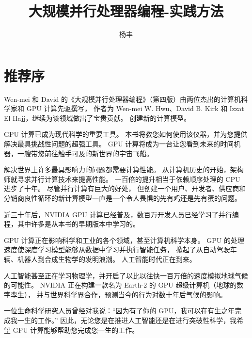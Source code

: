 \documentclass{ctexart}
\numberwithin{equation}{section}
\begin{document}
\title{大规模并行处理器编程-实践方法}

\author{杨丰}
\date{}
\maketitle

\tableofcontents

\newpage
\section*{推荐序}
Wen-mei 和 David 的《大规模并行处理器编程》（第四版）由两位杰出的计算机科学家和 GPU 计算先驱撰写，
作者为 Wen-mei W. Hwu、David B. Kirk 和 Izzat El Hajj，继续为该领域做出了宝贵贡献。 创建新的计算模型。

GPU 计算已成为现代科学的重要工具。 本书将教您如何使用该仪器，并为您提供解决最具挑战性问题的超强工具。 
GPU 计算将成为一台让您看到未来的时间机器，一艘带您前往触手可及的新世界的宇宙飞船。

解决世界上许多最具影响力的问题都需要计算性能。 从计算机历史的开始，架构师就寻求并行计算技术来提高性能。 
一百倍的提升相当于依赖顺序处理的 CPU 进步了十年。 尽管并行计算有巨大的好处，
但创建一个用户、开发者、供应商和分销商良性循环的新计算模型一直是一个令人畏惧的先有鸡还是先有蛋的问题。

近三十年后，NVIDIA GPU 计算已经普及，数百万开发人员已经学习了并行编程，其中许多是从本书的早期版本中学习的。

GPU 计算正在影响科学和工业的各个领域，甚至计算机科学本身。 GPU 的处理速度使深度学习模型能够从数据中学习并执行智能任务，
掀起了从自动驾驶车辆、机器人到合成生物学的发明浪潮。 人工智能时代正在到来。

人工智能甚至正在学习物理学，并开启了以比以往快一百万倍的速度模拟地球气候的可能性。 
NVIDIA 正在构建一款名为 Earth-2 的 GPU 超级计算机（地球的数字孪生），
并与世界科学界合作，预测当今的行为对数十年后气候的影响。

一位生命科学研究人员曾经对我说：“因为有了你的 GPU，我可以在有生之年完成我一生的工作。” 
因此，无论您是在推进人工智能还是在进行突破性科学，我希望 GPU 计算能够帮助您完成您一生的工作。
\\

\newpage


\newpage


\newpage


\newpage


\newpage

\end{document}
